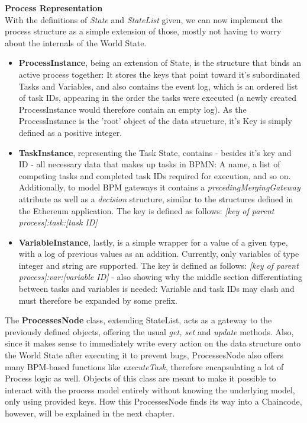 \textbf{Process Representation} \\[0.2em]
With the definitions of \emph{State} and \emph{StateList} given, we can now implement the process structure as a simple extension of those, mostly not having to worry about the internals of the World State. 
\begin{itemize}
    \item \textbf{ProcessInstance}, being an extension of State, is the structure that binds an active process together: It stores the keys that point toward it's subordinated Tasks and Variables, and also contains the event log, which is an ordered list of task IDs, appearing in the order the tasks were executed (a newly created ProcessInstance would therefore contain an empty log). As the ProcessInstance is the 'root' object of the data structure, it's Key is simply defined as a positive integer.
    \item \textbf{TaskInstance}, representing the Task State, contains - besides it's key and ID - all necessary data that makes up tasks in BPMN: A name, a list of competing tasks and completed task IDs required for execution, and so on. Additionally, to model BPM gateways it contains a \emph{precedingMergingGateway} attribute as well as a \emph{decision} structure, similar to the structures defined in the Ethereum application. The key is defined as follows: \emph{[key of parent process]:task:[task ID]}
    \item \textbf{VariableInstance}, lastly, is a simple wrapper for a value of a given type, with a log of previous values as an addition. Currently, only variables of type integer and string are supported. The key is defined as follows: \emph{[key of parent process]:var:[variable ID]} - also showing why the middle section differentiating between tasks and variables is needed: Variable and task IDs may clash and must therefore be expanded by some prefix.
\end{itemize}
The \textbf{ProcessesNode} class, extending StateList, acts as a gateway to the previously defined objects, offering the usual \emph{get, set} and \emph{update} methods. Also, since it makes sense to immediately write every action on the data structure onto the World State after executing it to prevent bugs, ProcessesNode also offers many BPM-based functions like \emph{executeTask}, therefore encapsulating a lot of Process logic as well. Objects of this class are meant to make it possible to interact with the process model entirely without knowing the underlying model, only using provided keys. \newline
How this ProcessesNode finds its way into a Chaincode, however, will be explained in the next chapter.

